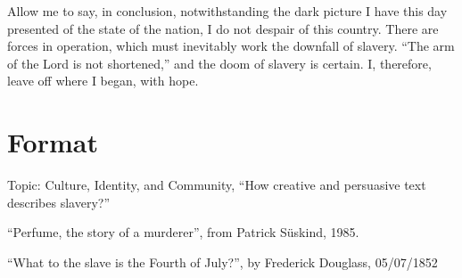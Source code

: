 \documentclass[a4paper,12pt]{article}
\begin{document}
\begin{linenumbers}
 Allow me to say, in conclusion, notwithstanding the dark picture I have this day presented of the state of the nation, I do not despair of this country. There are forces in operation, which must inevitably work the downfall of slavery. “The arm of the Lord is not shortened,” and the doom of slavery is certain. I, therefore, leave off where I began, with hope.
\end{linenumbers}

\newpage
\section{Format}

Topic: Culture, Identity, and Community, ``How creative and persuasive text describes slavery?''

``Perfume, the story of a murderer'', from Patrick S\"uskind, 1985.

``What to the slave is the Fourth of July?'', by Frederick Douglass, 05/07/1852
\end{document}
